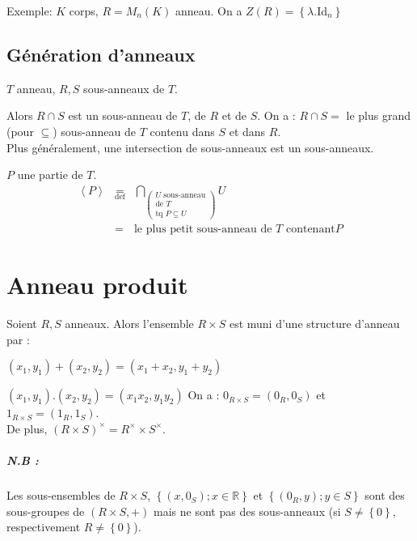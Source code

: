 \documentclass[reqno,a4paper,10pt]{report}
\makeatletter
\newcommand{\gen}[1]{\left\langle #1 \right\rangle} %
\newcommand{\set}[1]{\left\lbrace #1 \right\rbrace} %
\newcommand{\IR}{\ensuremath{\mathbb{R}}\xspace} %
\newcommand{\id}{\ensuremath{\mathrm{Id}}} %
\newcommand{\tdef}[1]{\underset{\text{def}}{ #1 }}
\let\olditemize=\itemize%
\renewenvironment{itemize}{%
    \olditemize%
  }{%
    \@noparlisttrue%
    \endlist%
  }%
\makeatother
\begin{document}
Exemple: $K$ corps, $R=M_n(K)$ anneau. On a $Z(R)=\set{\lambda . \id_n}$

\section{Génération d'anneaux}
$T$ anneau, $R,S$ sous-anneaux de $T$.
\begin{itemize}
  \item Alors $R \cap S$ est un sous-anneau de $T$, de $R$ et de $S$.
    On a : $R \cap S =$ le plus grand (pour $\subseteq$) sous-anneau de $T$
    contenu dans $S$ et dans $R$.\\
    Plus généralement, une intersection de sous-anneaux est un sous-anneaux.
  \item $P$ une partie de $T$.
    \begin{eqnarray*}
      \gen{P} &\tdef{=}&\bigcap_{
      \left(\begin{array}{c}
        U\text{ sous-anneau}\\
        \text{de } T\\
        \text{tq }P \subseteq U
      \end{array}\right)} U\\
      &=&\text{le plus petit sous-anneau de } T \text{ contenant} P
    \end{eqnarray*}
\end{itemize}


\chapter{Anneau produit}
Soient $R,S$ anneaux. Alors l'ensemble $R\times S$ est muni d'une structure
d'anneau par :
\begin{itemize}
  \item $(x_1, y_1)+(x_2, y_2) = (x_1+x_2, y_1+y_2)$
  \item $(x_1, y_1).(x_2, y_2) = (x_1x_2, y_1y_2)$
\end{itemize}
On a : $0_{R\times S}=(0_R, 0_S)$ et $1_{R\times S}=(1_R, 1_S)$.\\
De plus, $(R\times S)^\times = R^\times\times S^\times$.
\paragraph{N.B :}
Les sous-ensembles de $R\times S$, $\set{(x,0_S); x \in \IR}$ et $\set{(0_R,
y); y \in S}$ sont des sous-groupes de $(R\times S, +)$ mais ne sont pas
des sous-anneaux (si $S \neq \set{0}$, respectivement $R \neq \set{0}$).
\end{document}
